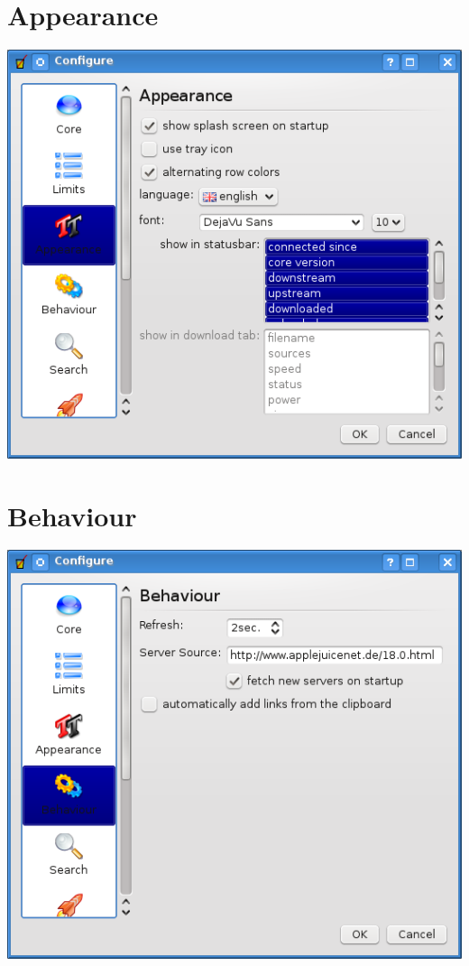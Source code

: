 \documentclass[a4paper,10pt]{book}
\begin{document}
\section{Appearance}
\label{sec:conf_appearance}
\includegraphics[width=1.0\textwidth]{./images/configure_appearance.png}

\section{Behaviour}
\label{sec:conf_behaviuor}
\includegraphics[width=1.0\textwidth]{./images/configure_behaviour.png}
\end{document}
